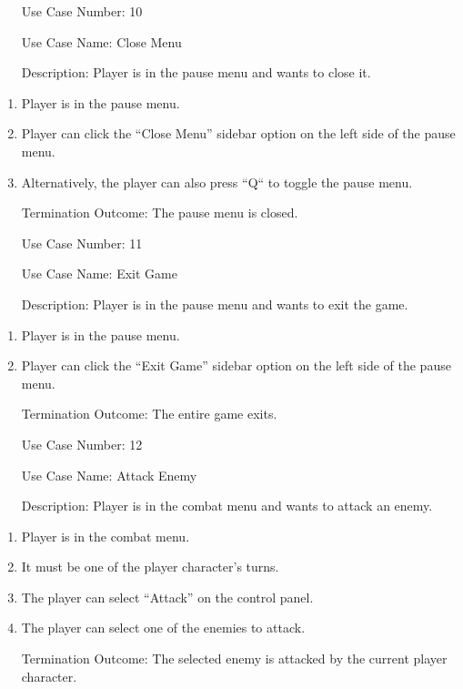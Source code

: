 \documentclass[10pt,conference,onecolumn,compsoc]{IEEEtran}
\begin{document}
\begin{itemize}
\item[Use Case Number:] 10
\item[Use Case Name:] Close Menu
\item[Description:] Player is in the pause menu and wants to close it.
\end{itemize}
\begin{enumerate}
\item Player is in the pause menu.
\item Player can click the “Close Menu” sidebar option on the left side of the pause menu.
\item Alternatively, the player can also press “Q“ to toggle the pause menu.
\item [Termination Outcome:] The pause menu is closed.
\end{enumerate}

\begin{itemize}
\item[Use Case Number:] 11
\item[Use Case Name:] Exit Game
\item[Description:] Player is in the pause menu and wants to exit the game.
\end{itemize}
\begin{enumerate}
\item Player is in the pause menu.
\item Player can click the “Exit Game” sidebar option on the left side of the pause menu.
\item [Termination Outcome:] The entire game exits.
\end{enumerate}

\begin{itemize}
\item[Use Case Number:] 12
\item[Use Case Name:] Attack Enemy
\item[Description:] Player is in the combat menu and wants to attack an enemy.
\end{itemize}
\begin{enumerate}
\item Player is in the combat menu.
\item It must be one of the player character's turns.
\item The player can select “Attack” on the control panel.
\item The player can select one of the enemies to attack.
\item [Termination Outcome:] The selected enemy is attacked by the current player character.
\end{enumerate}
\end{document}
